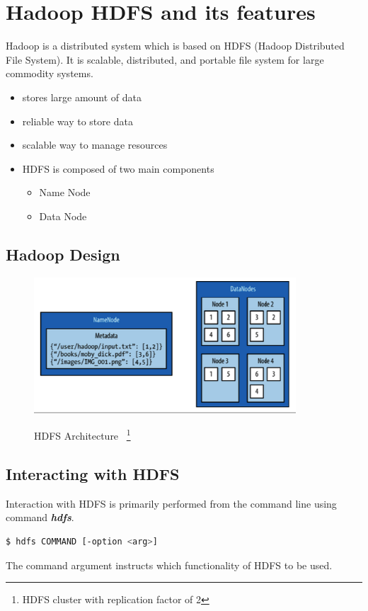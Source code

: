 \documentclass[pdf]{beamer}
\begin{document}
\section{Hadoop HDFS and its features}
\begin{frame}[fragile]{}
Hadoop is a distributed system which is based on HDFS (Hadoop Distributed File System). It is scalable, distributed, and portable file system for large commodity systems. 
\begin{itemize}
	\item stores large amount of data 
	\item reliable way to store data
	\item scalable way to manage resources
	\item HDFS is composed of two main components
	\begin{itemize}
		\item Name Node
		\item Data Node
	\end{itemize}
\end{itemize}
\end{frame}


\subsection{Hadoop Design}
\begin{frame}[fragile]{}
\begin{figure}[ht]
	    \begin{center}
        		\includegraphics[height=2in]{12.png} \cite{hpy}
    \end{center}
    \caption{HDFS Architecture ~\footnote{HDFS cluster with replication factor of  2}}
    \end{figure}
\end{frame}

\subsection{Interacting with HDFS}
\begin{frame}[fragile]{}
\noindent Interaction with HDFS is primarily performed from the command line using command \textbf{\emph{hdfs}}.
\begin{lstlisting}[language=bash]
  $ hdfs COMMAND [-option <arg>]
\end{lstlisting}
The command argument instructs which functionality of HDFS to be used.

\end{frame}
\end{document}

